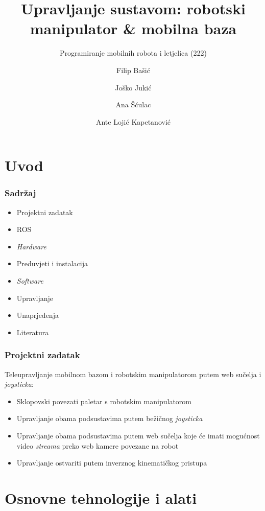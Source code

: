 \documentclass{beamer}
\title{Upravljanje sustavom: robotski manipulator \& mobilna baza}
\subtitle{Programiranje mobilnih robota i letjelica (222)}
\author{Filip Bašić \and Joško Jukić \and Ana Šćulac \and \newline Ante Lojić Kapetanović}
\institute[University of Split]{
    Zavod za elektroniku i računarstvo
    @FESB
}
\begin{document}
\maketitle

\section{Uvod}

\begin{frame}
    \frametitle{Sadržaj}

    \begin{itemize}
        \item Projektni zadatak\pause
        \item ROS\pause
        \item \emph{Hardware}\pause
        \item Preduvjeti i instalacija\pause
        \item \emph{Software}\pause
        \item Upravljanje\pause
        \item Unaprjeđenja\pause
        \item Literatura
    \end{itemize}
\end{frame}

\begin{frame}
    \frametitle{Projektni zadatak}
    Teleupravljanje mobilnom bazom i robotskim manipulatorom putem web sučelja i \emph{joysticka}:\newline
    \begin{itemize}
        \item Sklopovski povezati paletar s robotskim manipulatorom
        \item Upravljanje obama podsustavima putem bežičnog \emph{joysticka}
        \item Upravljanje obama podsustavima putem web sučelja koje će imati mogućnost video \emph{streama} preko web kamere povezane na robot
        \item Upravljanje ostvariti putem inverznog kinematičkog pristupa
    \end{itemize}
\end{frame}

\section{Osnovne tehnologije i alati}
\end{document}
